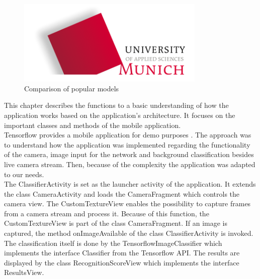 \begin{figure}[htbp]
\includegraphics[width=0.8\textwidth]{includes/MUASlogo}
\caption[Comparison of popular models]{Comparison of popular models \citep{TensorFlowMobileNet}}
\label{fig:FH-Logo8}
\end{figure} 

This chapter describes the functions to a basic understanding of how the application works based on the application's architecture. It focuses on the important classes and methods of the mobile application. \\
Tensorflow provides a mobile application for demo purposes \citep{TensorflowDemo}. The approach was to understand how the application was implemented regarding the functionality of the camera, image input for the network and background classification besides live camera stream. Then, because of the complexity the application was adapted to our needs.  \\

The ClassifierActivity is set as the launcher activity of the application. It extends the class CameraActivity and loads the CameraFragment which controls the camera view. The CustomTextureView enables the possibility to capture frames from a camera stream and process it. Because of this function, the CustomTextureView is part of the class CameraFragment. If an image is captured, the method onImageAvailable of the class ClassifierActivity is invoked. The classification itself is done by the TensorflowImageClassifier which implements the interface Classifier from the Tensorflow API. The results are displayed by the class RecognitionScoreView which implements the interface ResultsView.